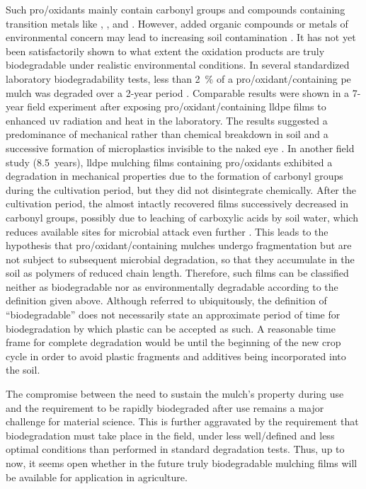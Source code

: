Such pro\-/oxidants mainly contain carbonyl groups and compounds containing transition metals like , , and  \citep{KyrikouBiodegradation2007}. However, added organic compounds or metals of environmental concern may lead to increasing soil contamination \citep{KoutnyBiodegradation2006,Scarascia-MugnozzaPlastic2011}. It has not yet been satisfactorily shown to what extent the oxidation products are truly biodegradable under realistic environmental conditions. In several standardized laboratory biodegradability tests, less than \SI{2}{\percent} of a pro\-/oxidant\-/containing \ac{pe} mulch was degraded over a \num{2}-year period \citep{FeuilloleyDegradation2005}. Comparable results were shown in a \num{7}-year field experiment after exposing pro\-/oxidant\-/containing \ac{lldpe} films to enhanced \ac{uv} radiation and heat in the laboratory. The results suggested a predominance of mechanical rather than chemical breakdown in soil and a successive formation of microplastics invisible to the naked eye \citep{BriassoulisDegradation2015}. In another field study (\num{8.5}~years), \ac{lldpe} mulching films containing pro\-/oxidants exhibited a degradation in mechanical properties due to the formation of carbonyl groups during the cultivation period, but they did not disintegrate chemically. After the cultivation period, the almost intactly recovered films successively decreased in carbonyl groups, possibly due to leaching of carboxylic acids by soil water, which reduces available sites for microbial attack even further \citep{BriassoulisAnalysis2015}. This leads to the hypothesis that pro\-/oxidant\-/containing mulches undergo fragmentation but are not subject to subsequent microbial degradation, so that they accumulate in the soil as polymers of reduced chain length. Therefore, such films can be classified neither as biodegradable nor as environmentally degradable according to the definition given above. Although referred to ubiquitously, the definition of ``biodegradable'' does not necessarily state an approximate period of time for biodegradation by which plastic can be accepted as such. A reasonable time frame for complete degradation would be until the beginning of the new crop cycle in order to avoid plastic fragments and additives being incorporated into the soil.

The compromise between the need to sustain the mulch's property during use and the requirement to be rapidly biodegraded after use remains a major challenge for material science. This is further aggravated by the requirement that biodegradation must take place in the field, under less well\-/defined and less optimal conditions than performed in standard degradation tests. Thus, up to now, it seems open whether in the future truly biodegradable mulching films will be available for application in agriculture.

